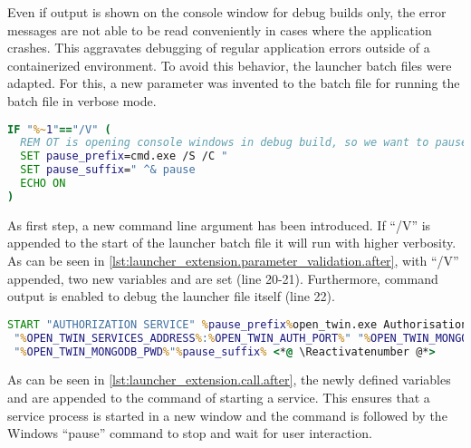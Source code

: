 Even if output is shown on the console window for debug builds only, the error messages are not able to be read conveniently in cases where the application crashes. This aggravates debugging of regular application errors outside of a containerized environment.
To avoid this behavior, the launcher batch files were adapted. For this, a new parameter was invented to the batch file for running the batch file in verbose mode.

\begin{lstlisting}[label=lst:launcher_extension.parameter_validation.after, caption={Additional command argument for preventing close of window after termination (\textit{/Microservices/Launcher/OpenTwin\_session.bat})}, language=cmd, firstnumber=18]
IF "%~1"=="/V" (
  REM OT is opening console windows in debug build, so we want to pause them at the end
  SET pause_prefix=cmd.exe /S /C "
  SET pause_suffix=" ^& pause
  ECHO ON
)
\end{lstlisting}
As first step, a new command line argument has been introduced. If \enquote{/V} is appended to the start of the launcher batch file it will run with higher verbosity.  As can be seen in \autoref{lst:launcher_extension.parameter_validation.after}, with \enquote{/V} appended, two new variables  and  are set (line 20-21). Furthermore, command output is enabled to debug the launcher file itself (line 22).

\begin{lstlisting}[label=lst:launcher_extension.call.after, caption={Additional command extension for preventing close of window after termination (\textit{/Microservices/Launcher/OpenTwin\_session.bat})}, language=cmd, firstnumber=34]
START "AUTHORIZATION SERVICE" %pause_prefix%open_twin.exe AuthorisationService.dll <*@ \Suppressnumber @*>
 "%OPEN_TWIN_SERVICES_ADDRESS%:%OPEN_TWIN_AUTH_PORT%" "%OPEN_TWIN_MONGODB_ADDRESS%"
 "%OPEN_TWIN_MONGODB_PWD%"%pause_suffix% <*@ \Reactivatenumber @*>
\end{lstlisting}
As can be seen in \autoref{lst:launcher_extension.call.after}, the newly defined variables  and  are appended to the command of starting a service. This ensures that a service process is started in a new window and the command is followed by the \ac{Windows} \enquote{pause} command to stop and wait for user interaction.


